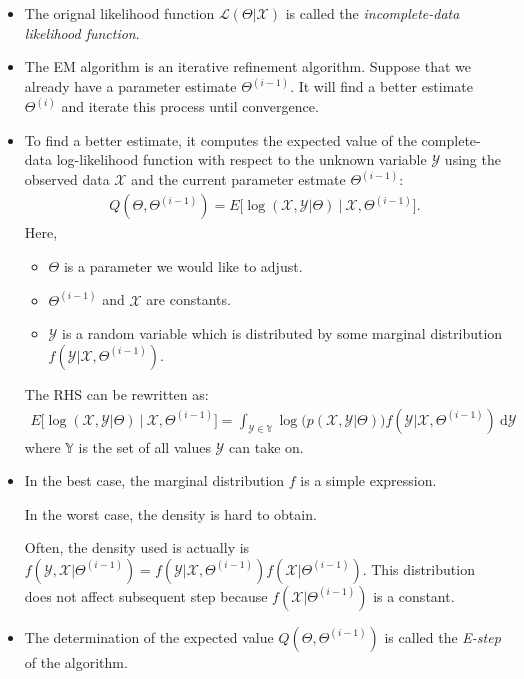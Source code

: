 \documentclass[10pt]{article}
\newcommand{\dee}{\mathrm{d}}
\newcommand{\likelihood}{\mathcal{L}}
\newcommand{\X}{\mathcal{X}}
\newcommand{\Y}{\mathcal{Y}}
\begin{document}
\begin{itemize}
    \item The orignal likelihood function $\likelihood(\Theta|\X)$ is called the \emph{incomplete-data likelihood function}.
    
    \item The EM algorithm is an iterative refinement algorithm. Suppose that we already have a parameter estimate $\Theta^{(i-1)}$. It will find a better estimate $\Theta^{(i)}$ and iterate this process until convergence.
    
    \item To find a better estimate, it computes the expected value of the complete-data log-likelihood function with respect to the unknown variable $\Y$ using the observed data $\X$ and the current parameter estmate $\Theta^{(i-1)}$:
    \begin{align*}
      Q(\Theta, \Theta^{(i-1)}) = E\big[ \log(\X, \Y | \Theta)\ \big|\ \X, \Theta^{(i-1)} \big].
    \end{align*}
    Here,
    \begin{itemize}
      \item $\Theta$ is a parameter we would like to adjust.
      \item $\Theta^{(i-1)}$ and $\X$ are constants.
      \item $\Y$ is a random variable which is distributed by some marginal distribution $f(\Y | \X, \Theta^{(i-1)})$.
    \end{itemize}
    The RHS can be rewritten as:
    \begin{align*}
      E\big[ \log(\X, \Y | \Theta)\ \big|\ \X, \Theta^{(i-1)} \big] = \int_{\Y \in \mathbb{Y}} \log\big( p(\X,\Y|\Theta) \big) f(\Y|\X,\Theta^{(i-1)})\ \dee\Y
    \end{align*}
    where $\mathbb{Y}$ is the set of all values $\Y$ can take on.
    
    \item In the best case, the marginal distribution $f$ is a simple expression.
    
    In the worst case, the density is hard to obtain.
    
    Often, the density used is actually is $f(\Y,\X|\Theta^{(i-1)}) = f(\Y|\X,\Theta^{(i-1)}) f(\X|\Theta^{(i-1)})$. This distribution does not affect subsequent step because $f(\X|\Theta^{(i-1)})$ is a constant.
    
    \item The determination of the expected value $Q(\Theta, \Theta^{(i-1)})$ is called the \emph{E-step} of the algorithm.
    

\end{itemize}
\end{document}

